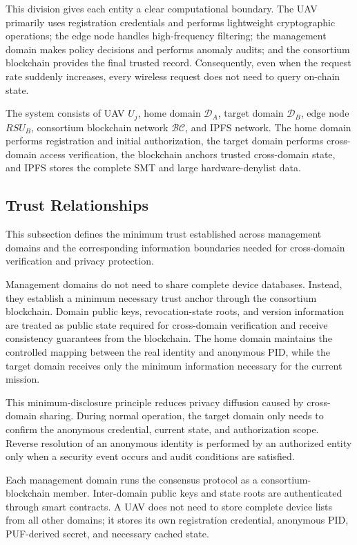 \documentclass[lettersize,journal]{IEEEtran}
\begin{document}
	This division gives each entity a clear computational boundary. The UAV primarily uses registration credentials and performs lightweight cryptographic operations; the edge node handles high-frequency filtering; the management domain makes policy decisions and performs anomaly audits; and the consortium blockchain provides the final trusted record. Consequently, even when the request rate suddenly increases, every wireless request does not need to query on-chain state.
	
	The system consists of UAV $U_j$, home domain $\mathcal{D}_A$, target domain $\mathcal{D}_B$, edge node $RSU_B$, consortium blockchain network $\mathcal{BC}$, and IPFS network. The home domain performs registration and initial authorization, the target domain performs cross-domain access verification, the blockchain anchors trusted cross-domain state, and IPFS stores the complete SMT and large hardware-denylist data.
	
	\subsection{Trust Relationships}
	This subsection defines the minimum trust established across management domains and the corresponding information boundaries needed for cross-domain verification and privacy protection.
	
	
	Management domains do not need to share complete device databases. Instead, they establish a minimum necessary trust anchor through the consortium blockchain. Domain public keys, revocation-state roots, and version information are treated as public state required for cross-domain verification and receive consistency guarantees from the blockchain. The home domain maintains the controlled mapping between the real identity and anonymous PID, while the target domain receives only the minimum information necessary for the current mission.
	
	This minimum-disclosure principle reduces privacy diffusion caused by cross-domain sharing. During normal operation, the target domain only needs to confirm the anonymous credential, current state, and authorization scope. Reverse resolution of an anonymous identity is performed by an authorized entity only when a security event occurs and audit conditions are satisfied.
	
	Each management domain runs the consensus protocol as a consortium-blockchain member. Inter-domain public keys and state roots are authenticated through smart contracts. A UAV does not need to store complete device lists from all other domains; it stores its own registration credential, anonymous PID, PUF-derived secret, and necessary cached state.
	
\end{document}
